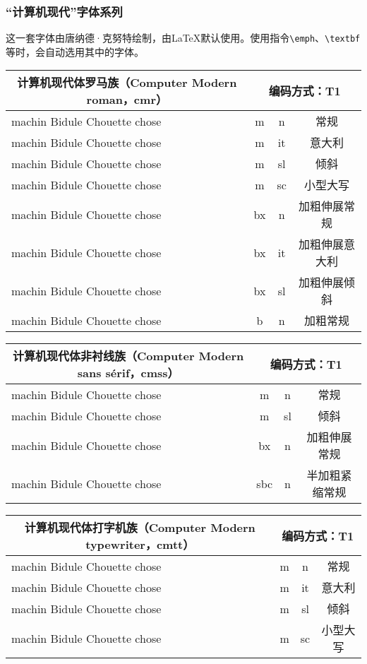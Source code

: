 \subsubsection{“计算机现代”字体系列}

这一套字体由唐纳德·克努特绘制，由\LaTeX 默认使用。使用指令\verb|\emph|、\verb|\textbf|等时，会自动选用其中的字体。

\newlength{\extrarowheight}

\newenvironment{decritfonte}[3][T1]{%
  \begin{center}
    \setlength{\extrarowheight}{2pt}
    \begin{tabular}{|l|c|c|c|}\hline%
      \multicolumn{1}{|c|}{#2#3）}&
      \multicolumn{3}{c|}{编码方式：#1}\\
      \hline
    }%
    {\end{tabular}
  \end{center}
}

\newcommand{\testefonte}[4]{%
    \fontencoding{#1}%
    \fontfamily{#2}%
    \fontseries{#3}%
    \fontshape{#4}%
    \selectfont}

\newcommand{\phrasetest}{machin Bidule Chouette chose}

\newcommand{\descriptionfonte}[5][T1]{%
  {\testefonte{#1}{#2}{#3}{#4}\phrasetest}&#3&#4&#5\\
  \hline}

  \begin{decritfonte}{计算机现代体罗马族（Computer Modern roman，}{cmr}
    \descriptionfonte{cmr}{m}{n}{常规}
    \descriptionfonte{cmr}{m}{it}{意大利}
    \descriptionfonte{cmr}{m}{sl}{倾斜}
    \descriptionfonte{cmr}{m}{sc}{小型大写}
    \descriptionfonte{cmr}{bx}{n}{加粗伸展常规}
    \descriptionfonte{cmr}{bx}{it}{加粗伸展意大利}
    \descriptionfonte{cmr}{bx}{sl}{加粗伸展倾斜}
    \descriptionfonte{cmr}{b}{n}{加粗常规}
  \end{decritfonte}
  
  \begin{decritfonte}{计算机现代体非衬线族（Computer Modern sans sérif，}{cmss}
    \descriptionfonte{cmss}{m}{n}{常规}
    \descriptionfonte{cmss}{m}{sl}{倾斜}
    \descriptionfonte{cmss}{bx}{n}{加粗伸展常规}
    \descriptionfonte{cmss}{sbc}{n}{半加粗紧缩常规}
  \end{decritfonte}
  
  \begin{decritfonte}{计算机现代体打字机族（Computer Modern typewriter，}{cmtt}
    \descriptionfonte{cmtt}{m}{n}{常规}
    \descriptionfonte{cmtt}{m}{it}{意大利}
    \descriptionfonte{cmtt}{m}{sl}{倾斜}
    \descriptionfonte{cmtt}{m}{sc}{小型大写}
  \end{decritfonte}
  
